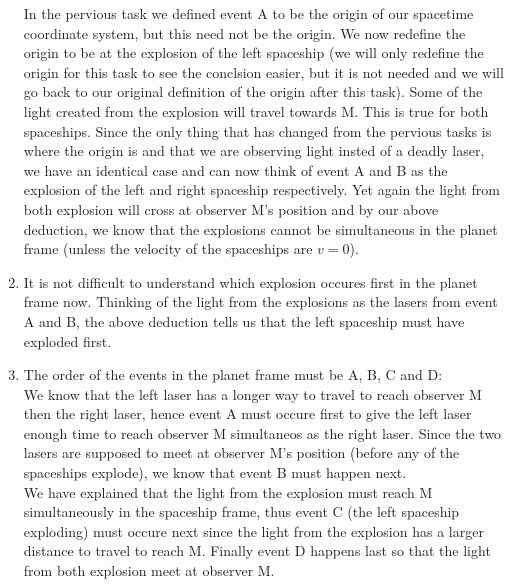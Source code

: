 \documentclass[a4paper,10pt,english]{article}
\begin{document}
\begin{enumerate}
In the pervious task we defined event A to be the origin of our spacetime coordinate system, but this need not be the origin. We now redefine the origin to be at the explosion of the left spaceship (we will only redefine the origin for this task to see the conclsion easier, but it is not needed and we will go back to our original definition of the origin after this task). Some of the light created from the explosion will travel towards M. This is true for both spaceships. Since the only thing that has changed from the pervious tasks is where the origin is and that we are observing light insted of a deadly laser, we have an identical case and can now think of event A and B as the explosion of the left and right spaceship respectively. Yet again the light from both explosion will cross at observer M's position and by our above deduction, we know that the explosions cannot be simultaneous in the planet frame (unless the velocity of the spaceships are $v=0$).
\item It is not difficult to understand which explosion occures first in the planet frame now. Thinking of the light from the explosions as the lasers from event A and B, the above deduction tells us that the left spaceship must have exploded first.
\item The order of the events in the planet frame must be A, B, C and D:
\\
We know that the left laser has a longer way to travel to reach observer M then the right laser, hence event A must occure first to give the left laser enough time to reach observer M simultaneos as the right laser. Since the two lasers are supposed to meet at observer M's position (before any of the spaceships explode), we know that event B must happen next.
\\
We have explained that the light from the explosion must reach M simultaneously in the spaceship frame, thus event C (the left spaceship exploding) must occure next since the light from the explosion has a larger distance to travel to reach M. Finally event D happens last so that the light from both explosion meet at observer M.
\end{enumerate}
\end{document}
